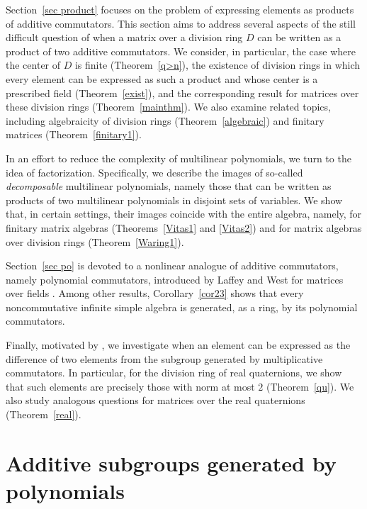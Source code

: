 \documentclass[11pt]{article}
\theoremstyle{definition}
\begin{document}
{{{{		
		Section~\ref{sec product} focuses on the problem of expressing elements as products of additive commutators. This section aims to address several aspects of the still difficult question of when a matrix over a division ring $D$ can be written as a product of two additive commutators. We consider, in particular, the case where the center of $D$ is finite (Theorem~\ref{q>n}), the existence of division rings in which every element can be expressed as such a product and whose center is a prescribed field (Theorem~\ref{exist}), and the corresponding result for matrices over these division rings (Theorem~\ref{mainthm}). We also examine related topics, including algebraicity of division rings (Theorem~\ref{algebraic}) and finitary matrices (Theorem~\ref{finitary1}).
		

		
		In an effort to reduce the complexity of multilinear polynomials, we turn to the idea of factorization. Specifically, we describe the images of so-called \textit{decomposable} multilinear polynomials, namely those that can be written as products of two multilinear polynomials in disjoint sets of variables. We show that, in certain settings, their images coincide with the entire algebra, namely, for finitary matrix algebras (Theorems~\ref{Vitas1} and \ref{Vitas2}) and for matrix algebras over division rings (Theorem~\ref{Waring1}).
		

		
		Section~\ref{sec po} is devoted to a nonlinear analogue of additive commutators, namely polynomial commutators, introduced by Laffey and West for matrices over fields \cite{Pa_LaWe_93}. Among other results, Corollary~\ref{cor23} shows that every noncommutative infinite simple algebra is generated, as a ring, by its polynomial commutators.
		
		Finally, motivated by \cite[Theorem~4.9]{Pa_PaSo_26}, we investigate when an element can be expressed as the difference of two elements from the subgroup generated by multiplicative commutators. In particular, for the division ring of real quaternions, we show that such elements are precisely those with norm at most $2$ (Theorem~\ref{qu}). We also study analogous questions for matrices over the real quaternions (Theorem~\ref{real}).
				
				\section{Additive subgroups generated by polynomials}\label{sec sub}
				
}}}}
\end{document}
